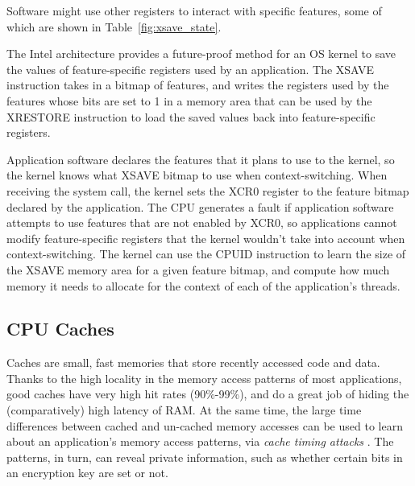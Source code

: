 Software might use other registers to interact with specific features, some of
which are shown in Table~\ref{fig:xsave_state}.

\begin{table}[hbt]
  \caption{Sample feature-specific Intel architecture registers.}
  \label{fig:xsave_state}
\end{table}

The Intel architecture provides a future-proof method for an OS kernel to save
the values of feature-specific registers used by an application. The XSAVE
instruction takes in a bitmap of features, and writes the registers used by
the features whose bits are set to 1 in a memory area that can be used by the
XRESTORE instruction to load the saved values back into feature-specific
registers.

Application software declares the features that it plans to use to the kernel,
so the kernel knows what XSAVE bitmap to use when context-switching. When
receiving the system call, the kernel sets the XCR0 register to the feature
bitmap declared by the application. The CPU generates a fault if application
software attempts to use features that are not enabled by XCR0, so applications
cannot modify feature-specific registers that the kernel wouldn't take into
account when context-switching. The kernel can use the CPUID instruction to
learn the size of the XSAVE memory area for a given feature bitmap, and compute
how much memory it needs to allocate for the context of each of the
application's threads.


\subsection{CPU Caches}
\label{sec:caching}

Caches are small, fast memories that store recently accessed code and data.
Thanks to the high locality in the memory access patterns of most applications,
good caches have very high hit rates (90\%-99\%), and do a great job of hiding
the (comparatively) high latency of RAM. At the same time, the large time
differences between cached and un-cached memory accesses can be used to learn
about an application's memory access patterns, via
\textit{cache timing attacks} \cite{banescu2011cache}. The patterns, in turn,
can reveal private information, such as whether certain bits in an encryption
key are set or not.

